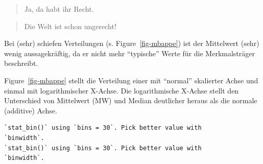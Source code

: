 \documentclass[
  letterpaper,
  DIV=11,
  numbers=noendperiod]{scrartcl}
\theoremstyle{definition}
\theoremstyle{definition}
\theoremstyle{definition}
\theoremstyle{remark}
\begin{document}
\begin{quote}
{} Ja, da habt ihr Recht.
\end{quote}

\begin{quote}
{} Die Welt ist schon ungerecht!
\end{quote}

\begin{tcolorbox}[enhanced jigsaw, breakable, toptitle=1mm, colback=white, leftrule=.75mm, colframe=quarto-callout-important-color-frame, colbacktitle=quarto-callout-important-color!10!white, title=\textcolor{quarto-callout-important-color}{\faExclamation}\hspace{0.5em}{Important}, toprule=.15mm, opacityback=0, arc=.35mm, coltitle=black, rightrule=.15mm, titlerule=0mm, bottomtitle=1mm, bottomrule=.15mm, left=2mm, opacitybacktitle=0.6]

Bei (sehr) schiefen Verteilungen (s. Figure~\ref{fig-mbappe}) ist der
Mittelwert (sehr) wenig aussagekräftig, da er nicht mehr ``typische''
Werte für die Merkmalsträger beschreibt.

\end{tcolorbox}

Figure~\ref{fig-mbappe} stellt die Verteilung einer mit ``normal''
skalierter Achse und einmal mit logarithmischer X-Achse. Die
logarithmische X-Achse stellt den Unterschied von Mittelwert (MW) und
Median deutlicher heraus als die normale (additive) Achse.

\begin{verbatim}
`stat_bin()` using `bins = 30`. Pick better value with
`binwidth`.
`stat_bin()` using `bins = 30`. Pick better value with
`binwidth`.
\end{verbatim}
\end{document}
